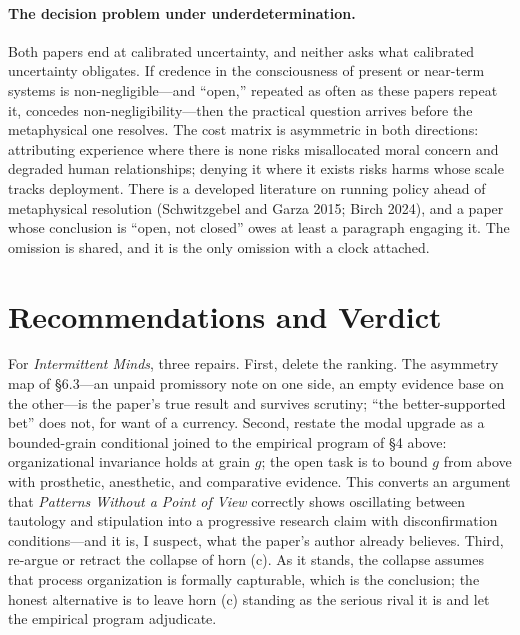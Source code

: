 \documentclass[11pt]{article}
\newcommand{\IM}{\emph{Intermittent Minds}}
\newcommand{\PP}{\emph{Patterns Without a Point of View}}
\begin{document}
\paragraph{The decision problem under underdetermination.} Both papers end at calibrated uncertainty, and neither asks what calibrated uncertainty obligates. If credence in the consciousness of present or near-term systems is non-negligible---and ``open,'' repeated as often as these papers repeat it, concedes non-negligibility---then the practical question arrives before the metaphysical one resolves. The cost matrix is asymmetric in both directions: attributing experience where there is none risks misallocated moral concern and degraded human relationships; denying it where it exists risks harms whose scale tracks deployment. There is a developed literature on running policy ahead of metaphysical resolution (Schwitzgebel and Garza 2015; Birch 2024), and a paper whose conclusion is ``open, not closed'' owes at least a paragraph engaging it. The omission is shared, and it is the only omission with a clock attached.

\section{Recommendations and Verdict}

For \IM{}, three repairs. First, delete the ranking. The asymmetry map of \S 6.3---an unpaid promissory note on one side, an empty evidence base on the other---is the paper's true result and survives scrutiny; ``the better-supported bet'' does not, for want of a currency. Second, restate the modal upgrade as a bounded-grain conditional joined to the empirical program of \S 4 above: organizational invariance holds at grain $g$; the open task is to bound $g$ from above with prosthetic, anesthetic, and comparative evidence. This converts an argument that \PP{} correctly shows oscillating between tautology and stipulation into a progressive research claim with disconfirmation conditions---and it is, I suspect, what the paper's author already believes. Third, re-argue or retract the collapse of horn (c). As it stands, the collapse assumes that process organization is formally capturable, which is the conclusion; the honest alternative is to leave horn (c) standing as the serious rival it is and let the empirical program adjudicate.
\end{document}
